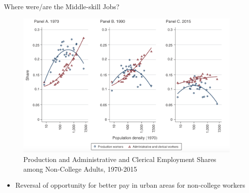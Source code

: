 \documentclass{beamer}
\begin{document}
\begin{frame}{Where were/are the Middle-skill Jobs?}

\begin{figure}
	\begin{center}
		\includegraphics[scale=0.24]{Figures/Fig6_MidSkill_EmpSh}
		\caption{Production and Administrative and Clerical Employment Shares among Non-College Adults, 1970-2015}
	\end{center}
\end{figure}

\begin{itemize}
	
	\item Reversal of opportunity for better pay in urban areas for non-college workers
	
\end{itemize}

\end{frame}
\end{document}

